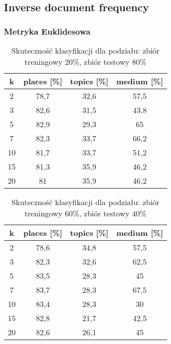 \documentclass{classrep}
\begin{document}
\subsection{Inverse document frequency}

\subsubsection{Metryka Euklidesowa}
\begin{table}[H]
	\centering
	\begin{tabular}{c c c c} 
		\hline
		\textbf{k} & \textbf{places [\%]} & \textbf{topics [\%]} &  \textbf{medium [\%]} \\ [0.5ex] 
		\hline
		\hline 
2 & 78,7 & 32,6 & 57,5 \\ 
3 & 82,6 & 31,5 & 43,8 \\ 
5 & 82,9 & 29,3 & 65 \\ 
7 & 82,3 & 33,7 & 66,2 \\ 
10 & 81,7 & 33,7 & 51,2 \\ 
15 & 81,3 & 35,9 & 46,2 \\ 
20 & 81 & 35,9 & 46,2 \\ 
		\hline
	\end{tabular}
	\caption{Skuteczność klasyfikacji dla podziału: zbiór treningowy 20\%, zbiór testowy 80\%}
\end{table}

\begin{table}[H]
	\centering
	\begin{tabular}{c c c c} 
		\hline
		\textbf{k} & \textbf{places [\%]} & \textbf{topics [\%]} &  \textbf{medium [\%]} \\ [0.5ex] 
		\hline
		\hline 
2 & 78,6 & 34,8 & 57,5 \\ 
3 & 82,3 & 32,6 & 62,5 \\ 
5 & 83,5 & 28,3 & 45 \\ 
7 & 83,7 & 28,3 & 67,5 \\ 
10 & 83,4 & 28,3 & 30 \\ 
15 & 82,8 & 21,7 & 42,5 \\ 
20 & 82,6 & 26,1 & 45 \\ 
		\hline
	\end{tabular}
	\caption{Skuteczność klasyfikacji dla podziału: zbiór treningowy 60\%, zbiór testowy 40\%}
\end{table}
\end{document}
